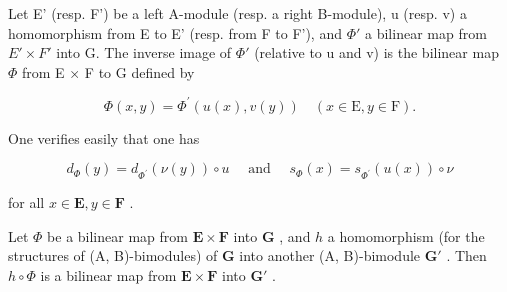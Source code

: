 Let E' (resp. F') be a left A-module (resp. a right B-module), u (resp. v) a homomorphism from E to E' (resp. from F to F'), and \(\Phi'\) a bilinear map from \(E' \times F'\) into G. The inverse image of \(\Phi'\) (relative to u and v) is the bilinear map \(\Phi\) from E × F to G defined by

\[
\Phi (x, y) = \Phi^ {\prime} (u (x), v (y)) \quad (x \in \mathrm{E}, y \in \mathrm{F}).
\]

One verifies easily that one has

\[
d _ {\Phi} (y) = d _ {\Phi^ {\prime}} (\nu (y)) \circ u \quad \text { and } \quad s _ {\Phi} (x) = s _ {\Phi^ {\prime}} (u (x)) \circ \nu
\]

for all \(x \in \mathbf{E}, y \in \mathbf{F}\) .

Let \(\Phi\) be a bilinear map from \(\mathbf{E} \times \mathbf{F}\) into \(\mathbf{G}\) , and \(h\) a homomorphism (for the structures of (A, B)-bimodules) of \(\mathbf{G}\) into another (A, B)-bimodule \(\mathbf{G}'\) . Then \(h \circ \Phi\) is a bilinear map from \(\mathbf{E} \times \mathbf{F}\) into \(\mathbf{G}'\) .

